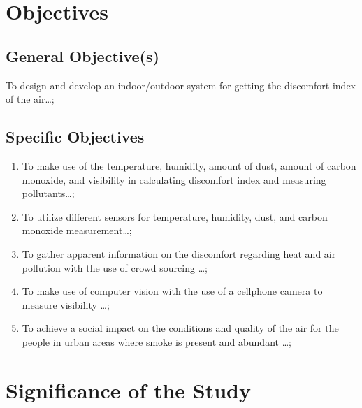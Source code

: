 \section{Objectives}
\subsection{General Objective(s)}
To design and develop an indoor/outdoor system for getting the discomfort index of the air\ldots;

\subsection{Specific Objectives}

\begin{enumerate}

	\item To make use of the temperature, humidity, amount of dust, amount of carbon monoxide, and visibility in calculating discomfort index and measuring pollutants\ldots;

	\item To utilize different sensors for temperature, humidity, dust, and carbon monoxide measurement\ldots;
	
	\item To gather apparent information on the discomfort regarding heat and air pollution with the use of crowd sourcing \ldots;
	
	\item To make use of computer vision with the use of a cellphone camera to measure visibility \ldots;
	
	\item To achieve a social impact on the conditions and quality of the air for the people in urban areas where smoke is present and abundant \ldots;
	
\end{enumerate}



\section{Significance of the Study}

